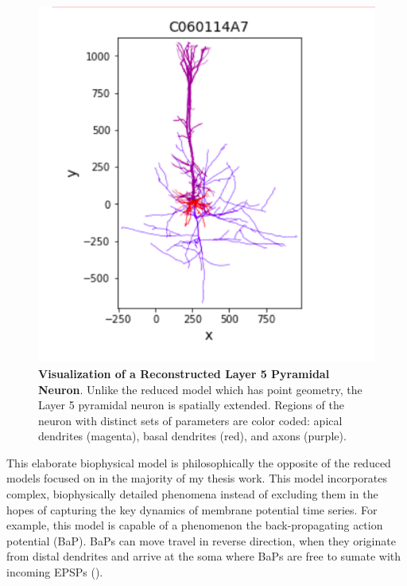 \begin{figure}%
  \begin{center}
    \includegraphics[scale=0.8]{figures/morphology_view.png}
    \caption[Visualization of a Reconstructed Layer 5 Pyramidal Neuron]{\textbf{Visualization of a Reconstructed Layer 5 Pyramidal Neuron}.
    Unlike the reduced model which has point geometry, the Layer 5 pyramidal neuron is spatially extended.
    Regions of the neuron with distinct sets of parameters are color coded: apical dendrites (magenta), basal dendrites (red), and axons (purple).
    }
  \label{fig:brief_shape}
  \end{center}
\end{figure}

This elaborate biophysical model is philosophically the opposite of the reduced models focused on in the majority of my thesis work. This model incorporates complex, biophysically detailed phenomena instead of excluding them in the hopes of capturing the key dynamics of membrane potential time series.
For example, this model is capable of a phenomenon the back-propagating action potential (BaP). BaPs can move travel in reverse direction, when they originate from distal dendrites and arrive at the soma where BaPs are free to sumate with incoming EPSPs (\cite{spruston2013information}).



